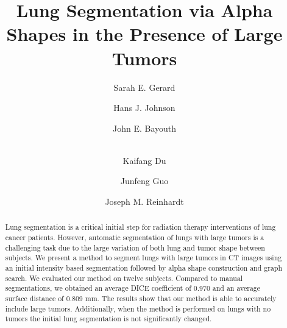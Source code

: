 \documentclass{llncs}
\begin{document}
%
\frontmatter          %
%
\pagestyle{headings}  %
%

%
%

\mainmatter              %
%
\title{Lung Segmentation via Alpha Shapes in the Presence of Large Tumors}
%
%
\author{
Sarah E. Gerard \and
Hans J. Johnson \and
John E. Bayouth \and\\
Kaifang Du \and
Junfeng Guo \and
Joseph M. Reinhardt
}
%
%
%


\maketitle              %

\begin{abstract}
Lung segmentation is a critical initial step for radiation therapy interventions of lung cancer patients. However, automatic segmentation of lungs with large tumors is a challenging task due to the large variation of both lung and tumor shape between subjects. We present a method to segment lungs with large tumors in CT images using an initial intensity based segmentation followed by alpha shape construction and graph search. We evaluated our method on twelve subjects. Compared to manual segmentations, we obtained an average DICE coefficient of 0.970 and an average surface distance of 0.809 mm. The results show that our method is able to accurately include large tumors. Additionally, when the method is performed on lungs with no tumors the initial lung segmentation is not significantly changed. 

\end{abstract}
%
\end{document}

